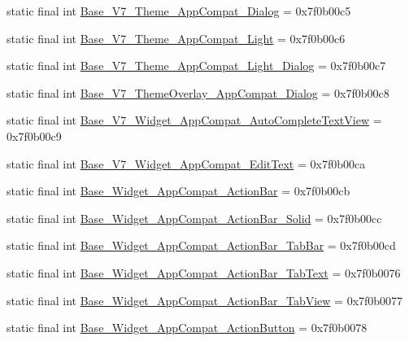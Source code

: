\begin{CompactItemize}
\item 
static final int \hyperlink{classandroid_1_1support_1_1v4_1_1_r_1_1style_87191998c2379621cc4e173132e8bc32}{Base\_\-V7\_\-Theme\_\-AppCompat\_\-Dialog} = 0x7f0b00c5
\item 
static final int \hyperlink{classandroid_1_1support_1_1v4_1_1_r_1_1style_b099db6a994d69d27f7064f2b8c23446}{Base\_\-V7\_\-Theme\_\-AppCompat\_\-Light} = 0x7f0b00c6
\item 
static final int \hyperlink{classandroid_1_1support_1_1v4_1_1_r_1_1style_17f856daa16b1840dfea27473bf88b57}{Base\_\-V7\_\-Theme\_\-AppCompat\_\-Light\_\-Dialog} = 0x7f0b00c7
\item 
static final int \hyperlink{classandroid_1_1support_1_1v4_1_1_r_1_1style_943f967c52bba4c2b6899583d2be798b}{Base\_\-V7\_\-ThemeOverlay\_\-AppCompat\_\-Dialog} = 0x7f0b00c8
\item 
static final int \hyperlink{classandroid_1_1support_1_1v4_1_1_r_1_1style_f5a4f8039d943c107bef9e4a22938344}{Base\_\-V7\_\-Widget\_\-AppCompat\_\-AutoCompleteTextView} = 0x7f0b00c9
\item 
static final int \hyperlink{classandroid_1_1support_1_1v4_1_1_r_1_1style_1f5d0233a27804c6df9a018e41e42c5b}{Base\_\-V7\_\-Widget\_\-AppCompat\_\-EditText} = 0x7f0b00ca
\item 
static final int \hyperlink{classandroid_1_1support_1_1v4_1_1_r_1_1style_e78351bb41b064ba800a0ee12cae14f5}{Base\_\-Widget\_\-AppCompat\_\-ActionBar} = 0x7f0b00cb
\item 
static final int \hyperlink{classandroid_1_1support_1_1v4_1_1_r_1_1style_743300274ce56c498c878884d0280cfa}{Base\_\-Widget\_\-AppCompat\_\-ActionBar\_\-Solid} = 0x7f0b00cc
\item 
static final int \hyperlink{classandroid_1_1support_1_1v4_1_1_r_1_1style_cb69d1fe28e010b5a8284582accd9444}{Base\_\-Widget\_\-AppCompat\_\-ActionBar\_\-TabBar} = 0x7f0b00cd
\item 
static final int \hyperlink{classandroid_1_1support_1_1v4_1_1_r_1_1style_2c3e018ff8a8664eebfec2538021b157}{Base\_\-Widget\_\-AppCompat\_\-ActionBar\_\-TabText} = 0x7f0b0076
\item 
static final int \hyperlink{classandroid_1_1support_1_1v4_1_1_r_1_1style_fa10f1d01cb8c22ced2b87bfb8ea5ba7}{Base\_\-Widget\_\-AppCompat\_\-ActionBar\_\-TabView} = 0x7f0b0077
\item 
static final int \hyperlink{classandroid_1_1support_1_1v4_1_1_r_1_1style_2f5fc3c742854c1af9d1ccc1a107ba5a}{Base\_\-Widget\_\-AppCompat\_\-ActionButton} = 0x7f0b0078
\item 

\end{CompactItemize}
